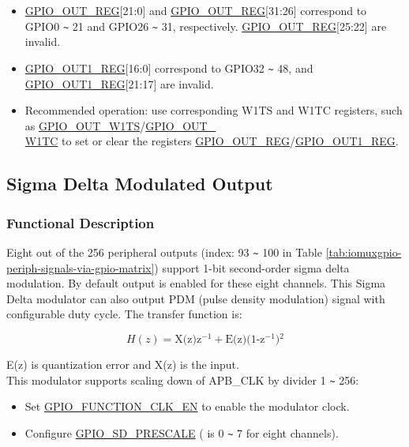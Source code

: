 \documentclass[main\_\_EN.tex]{subfiles}
\begin{document}
\begin{tiplisting}
\vspace{-2em}
\begin{itemize}
\item \hyperref[regdesc:GPIOOUTREG]{GPIO\_OUT\_REG}[21:0] and \hyperref[regdesc:GPIOOUTREG]{GPIO\_OUT\_REG}[31:26] correspond to GPIO0 \verb+~+ 21 and GPIO26 \verb+~+ 31, respectively. \hyperref[regdesc:GPIOOUTREG]{GPIO\_OUT\_REG}[25:22] are invalid.
\item \hyperref[regdesc:GPIOOUT1REG]{GPIO\_OUT1\_REG}[16:0] correspond to GPIO32 \verb+~+ 48, and \hyperref[regdesc:GPIOOUT1REG]{GPIO\_OUT1\_REG}[21:17] are invalid.
\item Recommended operation: use corresponding W1TS and W1TC registers, such as \hyperref[fielddesc:GPIOOUTW1TS]{GPIO\_OUT\_W1TS}/\hyperref[fielddesc:GPIOOUTW1TC]{GPIO\_OUT\_\\W1TC} to set or clear the registers \hyperref[regdesc:GPIOOUTREG]{GPIO\_OUT\_REG}/\hyperref[regdesc:GPIOOUT1REG]{GPIO\_OUT1\_REG}.
\end{itemize}
\end{tiplisting}

\subsection{Sigma Delta Modulated Output}

\subsubsection{Functional Description}

Eight out of the 256 peripheral outputs (index: 93 \verb+~+ 100 in Table \ref{tab:iomuxgpio-periph-signals-via-gpio-matrix}) support 1-bit second-order sigma delta modulation. By default output is enabled for these eight channels. This Sigma Delta modulator can also output PDM (pulse density modulation) signal with configurable duty cycle. The transfer function is:

\[
    H(z)=\textrm{X(z)z$^{-1}$} + \textrm{E(z)(1-z$^{-1}$)$^{2}$}
    \]

E(z) is quantization error and X(z) is the input.\\
This modulator supports scaling down of APB\_CLK by divider 1 \verb+~+ 256:
\begin{itemize}
    \item Set \hyperref[fielddesc:GPIOSDFUNCTIONCLKEN]{GPIO\_FUNCTION\_CLK\_EN} to enable the modulator clock.
    \item Configure \hyperref[fielddesc:GPIOSDSDNPRESCALE]{GPIO\_SD\_PRESCALE} ( is 0 \verb+~+ 7 for eight channels).
\end{itemize}
\end{document}
